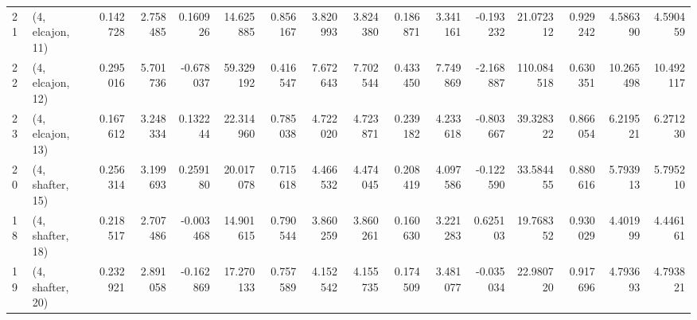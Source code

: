 \begin{tabular}{llrrrrrrrrrrrrrr}
21 &  (4, elcajon, 11) &   0.142728 &  2.758485 &  0.160926 &  14.625885 &  0.856167 &   3.820993 &  3.824380 &  0.186871 &   3.341161 & -0.193232 &   21.072312 &  0.929242 &   4.586390 &   4.590459 \\
22 &  (4, elcajon, 12) &   0.295016 &  5.701736 & -0.678037 &  59.329192 &  0.416547 &   7.672643 &  7.702544 &  0.433450 &   7.749869 & -2.168887 &  110.084518 &  0.630351 &  10.265498 &  10.492117 \\
23 &  (4, elcajon, 13) &   0.167612 &  3.248334 &  0.132244 &  22.314960 &  0.785038 &   4.722020 &  4.723871 &  0.239182 &   4.233618 & -0.803667 &   39.328322 &  0.866054 &   6.219521 &   6.271230 \\
20 &  (4, shafter, 15) &   0.256314 &  3.199693 &  0.259180 &  20.017078 &  0.715618 &   4.466532 &  4.474045 &  0.208419 &   4.097586 & -0.122590 &   33.584455 &  0.880616 &   5.793913 &   5.795210 \\
18 &  (4, shafter, 18) &   0.218517 &  2.707486 & -0.003468 &  14.901615 &  0.790544 &   3.860259 &  3.860261 &  0.160630 &   3.221283 &  0.625103 &   19.768352 &  0.930029 &   4.401999 &   4.446161 \\
19 &  (4, shafter, 20) &   0.232921 &  2.891058 & -0.162869 &  17.270133 &  0.757589 &   4.152542 &  4.155735 &  0.174509 &   3.481077 & -0.035034 &   22.980720 &  0.917696 &   4.793693 &   4.793821 \\
\bottomrule
\end{tabular}
